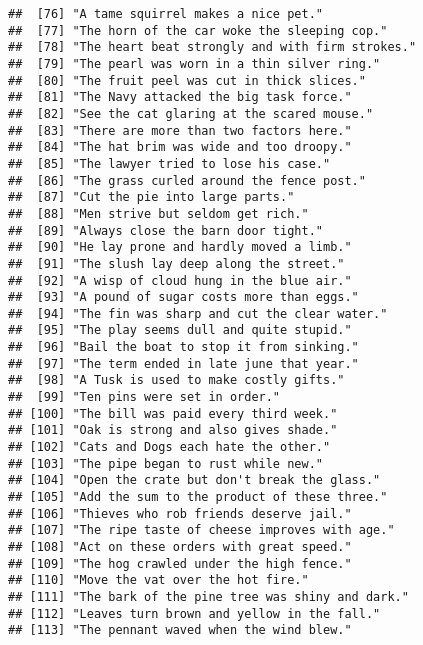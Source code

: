 \documentclass[
]{article}
\begin{document}
\begin{verbatim}
##  [76] "A tame squirrel makes a nice pet."                        
##  [77] "The horn of the car woke the sleeping cop."               
##  [78] "The heart beat strongly and with firm strokes."           
##  [79] "The pearl was worn in a thin silver ring."                
##  [80] "The fruit peel was cut in thick slices."                  
##  [81] "The Navy attacked the big task force."                    
##  [82] "See the cat glaring at the scared mouse."                 
##  [83] "There are more than two factors here."                    
##  [84] "The hat brim was wide and too droopy."                    
##  [85] "The lawyer tried to lose his case."                       
##  [86] "The grass curled around the fence post."                  
##  [87] "Cut the pie into large parts."                            
##  [88] "Men strive but seldom get rich."                          
##  [89] "Always close the barn door tight."                        
##  [90] "He lay prone and hardly moved a limb."                    
##  [91] "The slush lay deep along the street."                     
##  [92] "A wisp of cloud hung in the blue air."                    
##  [93] "A pound of sugar costs more than eggs."                   
##  [94] "The fin was sharp and cut the clear water."               
##  [95] "The play seems dull and quite stupid."                    
##  [96] "Bail the boat to stop it from sinking."                   
##  [97] "The term ended in late june that year."                   
##  [98] "A Tusk is used to make costly gifts."                     
##  [99] "Ten pins were set in order."                              
## [100] "The bill was paid every third week."                      
## [101] "Oak is strong and also gives shade."                      
## [102] "Cats and Dogs each hate the other."                       
## [103] "The pipe began to rust while new."                        
## [104] "Open the crate but don't break the glass."                
## [105] "Add the sum to the product of these three."               
## [106] "Thieves who rob friends deserve jail."                    
## [107] "The ripe taste of cheese improves with age."              
## [108] "Act on these orders with great speed."                    
## [109] "The hog crawled under the high fence."                    
## [110] "Move the vat over the hot fire."                          
## [111] "The bark of the pine tree was shiny and dark."            
## [112] "Leaves turn brown and yellow in the fall."                
## [113] "The pennant waved when the wind blew."                    

\end{verbatim}
\end{document}
